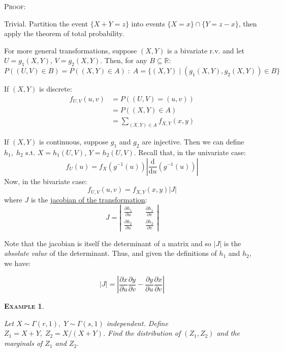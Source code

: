 \documentclass[12pt,a4paper]{article}
\newtheorem{example}{\textsc{Example}}[section]
\newcommand{\diff}{\mathrm{d}}
\begin{document}
\noindent\textsc{Proof:}\par\vspace{1cm}
\indent Trivial. Partition the event $\{X+Y=z\}$ into events $\{X=x\}\cap\{Y=z-x\}$, then apply the theorem of total probability.\par\vspace{1cm}

For more general transformations, suppose $(X,Y)$ is a bivariate r.v. and let $U=g_1(X,Y)$, $V=g_2(X,Y)$. Then, for any $B \subseteq \mathbb{R}$:
$$P((U,V)\in B) = P((X,Y) \in A)\; : \; A =\{(X,Y)\; | \; (g_1(X,Y),g_2(X,Y)) \in B\}$$

\noindent If $(X,Y)$ is discrete:
\begin{align*}
f_{U,V}(u,v) &= P((U,V)=(u,v))\\
&= P((X,Y)\in A)\\
&= \!\!\!\!\!\!\!\sum\limits_{(X,Y)\in A} \!\!\!\!\!\!\!\!f_{X,Y}(x,y)
\end{align*}

If $(X,Y)$ is continuous, suppose $g_1$ and $g_2$ are injective. Then we can define $h_1,\; h_2$ s.t. $X=h_1(U,V)$, $Y=h_2(U,V)$. Recall that, in the univariate case:
$$f_U(u) = f_X\left(g^{-1}(u)\right) \left| \frac{\diff}{\diff u}\left(g^{-1}(u)\right)\right|$$
Now, in the bivariate case:
$$f_{U,V}(u,v) = f_{X,Y}(x,y)|J|$$
where $J$ is the \underline{jacobian of the transformation}:
\begingroup
\renewcommand*{\arraystretch}{1.5}
$$J = \left|\begin{array}{cc} \frac{\partial h_1}{\partial u}\quad & \frac{\partial h_1}{\partial v}\\ \frac{\partial h_2}{\partial u}\quad & \frac{\partial h_2}{\partial v}\end{array}\right|$$
\endgroup

Note that the jacobian is itself the determinant of a matrix and so $|J|$ is the \emph{absolute value} of the determinant. Thus, and given the definitions of $h_1$ and $h_2$, we have:

$$|J| = \left| \frac{\partial x}{\partial u}\frac{\partial y}{\partial v} - \frac{\partial y}{\partial u}\frac{\partial x}{\partial v}\right|$$

\begin{example}$\;$\par
\vspace{1cm}

Let $X \sim \Gamma(r,1),\; Y \sim \Gamma(s,1)$ independent. Define $Z_1=X+Y,\; Z_2=X/(X+Y)$. Find the distribution of $(Z_1,Z_2)$ and the marginals of $Z_1$ and $Z_2$.
\end{example}
\end{document}
